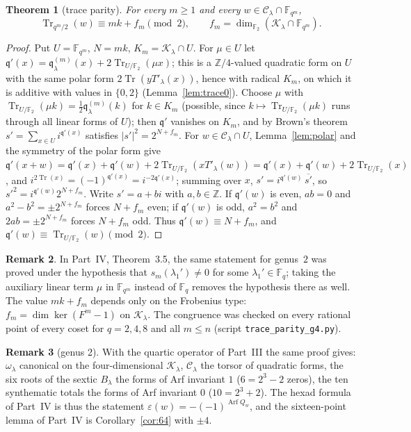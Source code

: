 \documentclass[12pt,a4paper]{amsart}
\newtheorem{theorem}{Theorem}[section]
\theoremstyle{definition}
\newtheorem{remark}[theorem]{Remark}
\newcommand{\F}{\mathbb{F}}
\newcommand{\Z}{\mathbb{Z}}
\newcommand{\Tr}{\operatorname{Tr}}
\newcommand{\Arf}{\operatorname{Arf}}
\newcommand{\eps}{\varepsilon}
\newcommand{\Kk}{\mathcal{K}}
\newcommand{\Cc}{\mathcal{C}}
\newcommand{\qq}{\mathfrak{q}}
\newcommand{\Fq}{\F_{q}}
\begin{document}
\begin{theorem}[trace parity]\label{thm:traceparity}
For every $m\ge1$ and every $w\in\Cc_\lambda\cap\F_{q^m}$,
\[
\Tr_{q^m/2}(w)\equiv mk+f_m\pmod 2,\qquad f_m=\dim_{\F_2}(\Kk_\lambda\cap\F_{q^m}).
\]
\end{theorem}
\begin{proof}
Put $U=\F_{q^m}$, $N=mk$, $K_m=\Kk_\lambda\cap U$. For $\mu\in U$ let $\qq'(x)=\qq^{(m)}_\lambda(x)+2\Tr_{U/\F_2}(\mu x)$; this is a $\Z/4$-valued quadratic form on $U$ with the same polar form $2\Tr(yT'_\lambda(x))$, hence with radical $K_m$, on which it is additive with values in $\{0,2\}$ (Lemma~\ref{lem:trace0}). Choose $\mu$ with $\Tr_{U/\F_2}(\mu k)=\frac12\qq^{(m)}_\lambda(k)$ for $k\in K_m$ (possible, since $k\mapsto\Tr_{U/\F_2}(\mu k)$ runs through all linear forms of $U$); then $\qq'$ vanishes on $K_m$, and by Brown's theorem \cite{Brown} $s'=\sum_{x\in U}i^{\qq'(x)}$ satisfies $|s'|^2=2^{N+f_m}$. For $w\in\Cc_\lambda\cap U$, Lemma~\ref{lem:polar} and the symmetry of the polar form give $\qq'(x+w)=\qq'(x)+\qq'(w)+2\Tr_{U/\F_2}(xT'_\lambda(w))=\qq'(x)+\qq'(w)+2\Tr_{U/\F_2}(x)$, and $i^{2\Tr(x)}=(-1)^{\qq'(x)}=i^{-2\qq'(x)}$; summing over $x$, $s'=i^{\qq'(w)}\,\overline{s'}$, so $s'^2=i^{\qq'(w)}2^{N+f_m}$. Write $s'=a+bi$ with $a,b\in\Z$. If $\qq'(w)$ is even, $ab=0$ and $a^2-b^2=\pm2^{N+f_m}$ forces $N+f_m$ even; if $\qq'(w)$ is odd, $a^2=b^2$ and $2ab=\pm2^{N+f_m}$ forces $N+f_m$ odd. Thus $\qq'(w)\equiv N+f_m$, and $\qq'(w)\equiv\Tr_{U/\F_2}(w)\pmod 2$.
\end{proof}

\begin{remark}
In Part~IV, Theorem~3.5, the same statement for genus~$2$ was proved under the hypothesis that $s_m(\lambda_1')\ne0$ for some $\lambda_1'\in\Fq$; taking the auxiliary linear term $\mu$ in $\F_{q^m}$ instead of $\Fq$ removes the hypothesis there as well. The value $mk+f_m$ depends only on the Frobenius type: $f_m=\dim\ker(F^m-1)$ on $\Kk_\lambda$. The congruence was checked on every rational point of every coset for $q=2,4,8$ and all $m\le n$ (script \texttt{trace\_parity\_g4.py}).
\end{remark}

\begin{remark}[genus 2]
With the quartic operator of Part~III the same proof gives: $\omega_\lambda$ canonical on the four-dimensional $\Kk_\lambda$, $\Cc_\lambda$ the torsor of quadratic forms, the six roots of the sextic $B_\lambda$ the forms of Arf invariant $1$ ($6=2^3-2$ zeros), the ten synthematic totals the forms of Arf invariant $0$ ($10=2^3+2$). The hexad formula of Part~IV is thus the statement $\eps(w)=-(-1)^{\Arf Q_w}$, and the sixteen-point lemma of Part~IV is Corollary~\ref{cor:64} with $\pm4$.
\end{remark}
\end{document}
